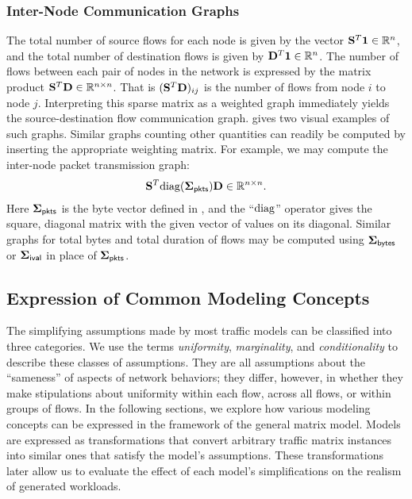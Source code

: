 \documentclass[twocolumn,final]{svjour3}
\begin{document}
\subsubsection{Inter-Node Communication Graphs}
\label{sec:communication-topology}

The total number of source flows for each node is given by the vector ${\mathbf{S}}^T\mathbf{1} \in \mathbb{R}^n$, and the total number of destination flows is given by ${\mathbf{D}}^T\mathbf{1} \in \mathbb{R}^n$.
The number of flows between each pair of nodes in the network is expressed by the matrix product ${\mathbf{S}}^T\mathbf{D}\in\mathbb{R}^{n \times n}$.
That is $({\mathbf{S}}^T\mathbf{D})_{ij}$ is the number of flows from node $i$ to node $j$.
Interpreting this sparse matrix as a weighted graph immediately yields the source-destination flow communication graph.
 gives two visual examples of such graphs.
Similar graphs counting other quantities can readily be computed by inserting the appropriate weighting matrix.
For example, we may compute the inter-node packet transmission graph:
\begin{align}
\trans{\mat{S}}\diag(\vec{\Sigma}_\pkts)\mat{D}\in\R^{n \times n}.
\end{align}
Here $\vec{\Sigma}_\pkts$ is the byte vector defined in , and the ``$\text{diag}$'' operator gives the square, diagonal matrix with the given vector of values on its diagonal.
Similar graphs for total bytes and total duration of flows may be computed using $\mathbf{\Sigma}_{\text{\textsf{bytes}}}$ or $\mathbf{\Sigma}_{\text{\textsf{ival}}}$ in place of $\mathbf{\Sigma}_{\text{\textsf{pkts}}}$.

\subsection{Expression of Common Modeling Concepts}

The simplifying assumptions made by most traffic models can be classified into three categories. We use the terms \textit{uniformity}, \textit{marginality}, and \textit{conditionality} to describe these classes of assumptions. They are all assumptions about the ``sameness'' of aspects of network behaviors; they differ, however, in whether they make stipulations about uniformity within each flow, across all flows, or within groups of flows. In the following sections, we explore how various modeling concepts can be expressed in the framework of the general matrix model. Models are expressed as transformations that convert arbitrary traffic matrix instances into similar ones that satisfy the model's assumptions. These transformations later allow us to evaluate the effect of each model's simplifications on the realism of generated workloads.
\end{document}
